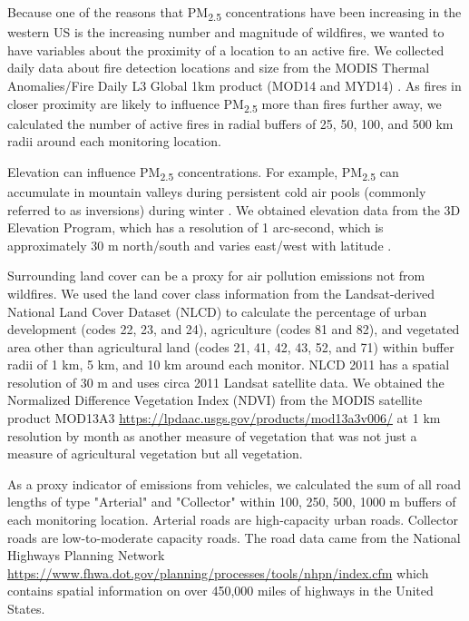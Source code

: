 \documentclass[english]{article}
\begin{document}
Because one of the reasons that PM\textsubscript{2.5} concentrations have been increasing in the western US is the increasing number and magnitude of wildfires, we wanted to have variables about the proximity of a location to an active fire. 
We collected daily data about fire detection locations and size from the MODIS Thermal Anomalies/Fire Daily L3 Global 1km product (MOD14 and MYD14) \cite{Giglio2006,Hawbaker2017}. 
As fires in closer proximity are likely to influence PM\textsubscript{2.5} more than fires further away, we calculated the number of active fires in radial buffers of 25, 50, 100, and 500 km radii around each monitoring location. 

Elevation can influence PM\textsubscript{2.5} concentrations. For example, PM\textsubscript{2.5} can accumulate in mountain valleys during persistent cold air pools (commonly referred to as inversions) 
during winter \cite{Whiteman2014}. We obtained elevation data from the 3D Elevation Program, which has a resolution of 1 arc-second, which is approximately 30 m north/south and varies east/west with latitude \cite{USGSElevation2017}.

Surrounding land cover can be a proxy for air pollution emissions not from wildfires. We used the land cover class information from the Landsat-derived National Land Cover Dataset (NLCD) \cite{Homer2017} to calculate the percentage of urban development (codes 22, 23, and 24), agriculture (codes 81 and 82), and vegetated area other than agricultural land (codes 21, 41, 42, 43, 52, and 71) within buffer radii of 1 km, 5 km, and 10 km around each monitor. NLCD 2011 has a spatial resolution of 30 m and uses circa 2011 Landsat satellite data. We obtained the Normalized Difference Vegetation Index (NDVI) from the MODIS satellite product MOD13A3 \url{https://lpdaac.usgs.gov/products/mod13a3v006/} at 1 km resolution by month as another measure of vegetation that was not just a measure of agricultural vegetation but all vegetation. 

As a proxy indicator of emissions from vehicles, we calculated the sum of all road lengths of type "Arterial" and "Collector" within 100, 250, 500, 1000 m buffers of each monitoring location. Arterial roads are high-capacity urban roads. Collector roads are low-to-moderate capacity roads. The road data came from the National Highways Planning Network \url{https://www.fhwa.dot.gov/planning/processes/tools/nhpn/index.cfm} which contains spatial information on over 450,000 miles of highways in the United States. 
\end{document}
